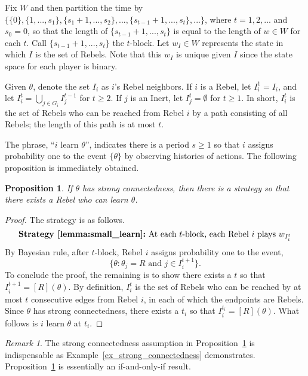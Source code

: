 \documentclass[12pt,letter]{article}
\newtheorem{proposition}{Proposition}[section]
\theoremstyle{definition}
\theoremstyle{remark}
\newtheorem*{remark}{Remark}
\theoremstyle{claim}
\begin{document}
Fix $W$ and then partition the time by $\{\{0\},\{1,...,s_1\},\{s_1+1,...,s_2\},...,\{s_{t-1}+1,...,s_t\},...\}$, where $t=1,2,...$ and $s_{0}=0$, so that the length of $\{s_{t-1}+1,...,s_t\}$ is equal to the length of $w\in W$ for each $t$. Call $\{s_{t-1}+1,...,s_t\}$ the $t$-block. Let $w_I\in W$ represents the state in which $I$ is the set of Rebels. Note that this $w_I$ is unique given $I$ since the state space for each player is binary. 

Given $\theta$, denote the set $I_i$ as $i$'s Rebel neighbors. If $i$ is a Rebel, let $I^1_i= I_i$, and let $I^t_i= \bigcup_{j\in G_i} I^{t-1}_j$ for $t\geq 2$. If $j$ is an Inert, let $I^t_j=\emptyset$ for $t\geq 1$. In short, $I^t_i$ is the set of Rebels who can be reached from Rebel $i$ by a path consisting of all Rebels; the length of this path is at most $t$.

The phrase, ``$i$ learn $\theta$'', indicates there is a period $s\geq 1$ so that $i$ assigns probability one to the event $\{\theta\}$ by observing histories of actions. The following proposition is immediately obtained. 
\begin{proposition}
\label{lemma:small_learn}
If $\theta$ has strong connectedness, then there is a strategy so that there exists a Rebel who can learn $\theta$.
\end{proposition}
\begin{proof} The strategy is as follows.
\[\textbf{Strategy~\ref{lemma:small_learn}:}\text{ At each $t$-block, each Rebel $i$ plays $w_{I^t_i}$}\]
By Bayesian rule, after $t$-block, Rebel $i$ assigns probability one to the event, \[\{\theta: \text{$\theta_j=R$ and $j\in I^{t+1}_i$}\}.\] To conclude the proof, the remaining is to show there exists a $t$ so that $I^{t+1}_i=[R](\theta)$. By definition, $I^t_i$ is the set of Rebels who can be reached by at most $t$ consecutive edges from Rebel $i$, in each of which the endpoints are Rebels. Since $\theta$ has strong connectedness, there exists a $t_i$ so that $I^{t_i}_i=[R](\theta)$. What follows is $i$ learn $\theta$ at $t_i$.
\end{proof}

\begin{remark}
The strong connectedness assumption in Proposition~\ref{lemma:small_learn} is indispensable as Example~\ref{ex_strong_connectedness} demonstrates. Proposition~\ref{lemma:small_learn} is essentially an if-and-only-if result.
\end{remark}
\end{document}
